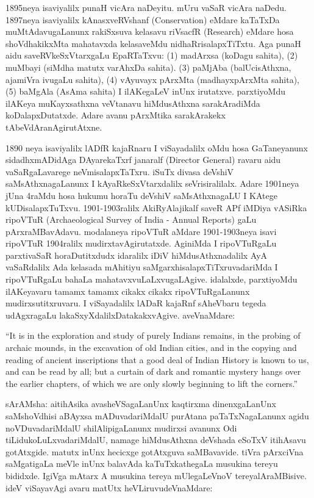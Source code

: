 \documentclass[11pt,a4size]{article}
\begin{document}
1895neya isaviyalilx punaH vicAra naDeyitu. mUru vaSaR vicAra
naDedu. 1897neya isaviyalilx kAnasxveRVshanf {\rm
    (Conservation)} eMdare kaTaTxDa muMtAdavugaLanunx rakiSxsuva
kelasavu riVsacfR {\rm (Research)} eMdare hosa
shoVdhakikxMta mahatavxda kelasaveMdu nidhaRrisalapxTiTxtu. Aga punaH
aidu saveRVkeSxVtarxgaLu EpaRTaTxvu: (1) madArxsa (koDagu sahita), (2)
muMbayi (siMdha matutx varAhxDa sahita). (3) paMjAba (balUcisAthxna,
ajamiVra ivugaLu sahita), (4) vAyuvayx pArxMta (madhayxpArxMta
sahita), (5) baMgAla (AsAma sahita) I ilAKegaLeV inUnx
irutatxve. parxtiyoMdu ilAKeya muKayxsathxna veVtanavu hiMdusAthxna
sarakAradiMda koDalapxDutatxde. Adare avanu pArxMtika sarakArakekx
tAbeVdAranAgirutAtxne.

1890 neya isaviyalilx lADfR kajaRnaru I viSayadalilx oMdu hosa
GaTaneyanunx sidadhxmADidAga DAyarekaTxrf janaralf {\rm
    (Director General)} ravaru aidu vaSaRgaLavarege
neVmisalapxTaTxru. iSuTx divasa deVshiV saMsAthxnagaLanunx I
kAyaRkeSxVtarxdalilx seVrisiralilalx. Adare 1901neya jUna 4raMdu hosa
hukumu horaTu deVshiV saMsAthxnagaLU I KAtege
kUDisalapxTuTxvu. 1901-1903ralilx AkiRyAlajikalf saveR APf iMDiya
vASiRka ripoVTuR {\rm (Archaeological Survey of India -
    Annual Reports)} gaLu pArxraMBavAdavu. modalaneya ripoVTuR aMdare
1901-1903neya isavi ripoVTuR 1904ralilx mudirxtavAgirutatxde. AginiMda
I ripoVTuRgaLu parxtivaSaR horaDutitxdudx idaralilx iDiV
hiMdusAthxnadalilx AyA vaSaRdalilx Ada kelasada mAhitiyu
saMgarxhisalapxTiTxruvadariMda I ripoVTuRgaLu bahaLa
mahatavxvuLaLxvugaLAgive. idalalxde, parxtiyoMdu ilAKeyavaru tamamx
tamamx cikakx cikakx ripoVTuRgaLanunx mudirxsutitxruvaru. I
viSayadalilx lADaR kajaRnf sAheVbaru tegeda udAgxragaLu
lakaSxyXdalilxDatakakxvAgive. aveVnaMdare:

{
\rm
``It is in the exploration and study of purely Indians remains, in the
probing of archaic mounds, in the excavation of old Indian cities, and
in the copying and reading of ancient inscriptions that a good deal of
Indian History is known to us, and can be read by all; but a curtain
of dark and romantic mystery hangs over the earlier chapters, of which
we are only slowly beginning to lift the corners.''}

sArAMsha: aitihAsika avasheVSagaLanUnx kaqtirxma dinenxgaLanUnx
saMshoVdhisi aBAyxsa mADuvadariMdalU purAtana paTaTxNagaLanunx agidu
noVDuvadariMdalU shilAlipigaLanunx mudirxsi avanunx Odi
tiLidukoLuLxvadariMdalU, namage hiMdusAthxna deVshada eSoTxV itihAsavu
gotAtxgide. matutx inUnx hecicxge gotAtxguva saMBavavide. tiVra
pArxciVna saMgatigaLa meVle inUnx balavAda kaTuTxkathegaLa musukina
tereyu bididxde. IgiVga mAtarx A musukina tereya mUlegaLeVnoV
tereyalAraMBisive. ideV viSayavAgi avaru matUtx heVLiruvudeVnaMdare:
\end{document}

